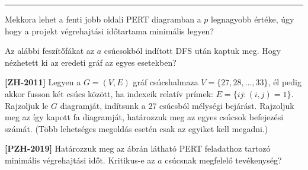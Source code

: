 \documentclass[a4paper,12pt]{article}
\begin{document}
\begin{enumerate}
        \hrule

        \item Mekkora lehet a fenti jobb oldali PERT diagramban a $p$ legnagyobb értéke, úgy hogy a projekt végrehajtási időtartama minimális legyen?
        
        \item Az alábbi feszítőfákat az $a$ csúcsokból indított DFS után kaptuk meg. Hogy nézhetett ki az eredeti gráf az egyes esetekben? 
        \begin{figure}[!h]
            \centering
            \begin{subfigure}{0.2\textwidth}
                \centering
                
            \end{subfigure}
            \begin{subfigure}{0.2\textwidth}
                \centering
                
            \end{subfigure}
            \begin{subfigure}{0.2\textwidth}
                \centering
                
            \end{subfigure}
            \begin{subfigure}{0.2\textwidth}
                \centering
                
            \end{subfigure}
        \end{figure}

        \item \label{feladat:zh2011} \textbf{[ZH-2011]} Legyen a $G=(V, E)$ gráf csúcshalmaza $V = \{27,28,\ldots,33\}$, él pedig akkor fusson két csúcs között, ha indexeik relatív prímek: $E = \{ij:(i,j) = 1\}$. Rajzoljuk le $G$ diagramját, indítsunk a $27$ csúcsból mélységi bejárást. Rajzoljuk meg az így kapott fa diagramját, határozzuk meg az egyes csúcsok befejezési számát. (Több lehetséges megoldás esetén csak az egyiket kell megadni.)

        \begin{minipage}{0.6\textwidth}
            \item \textbf{[PZH-2019]} Határozzuk meg az ábrán látható PERT feladathoz tartozó minimális végrehajtási időt. Kritikus-e az $a$ csúcsnak megfelelő tevékenység?
        \end{minipage}
        \begin{minipage}{0.3\textwidth}
            \centering
            
        \end{minipage}


\end{enumerate}
\end{document}
